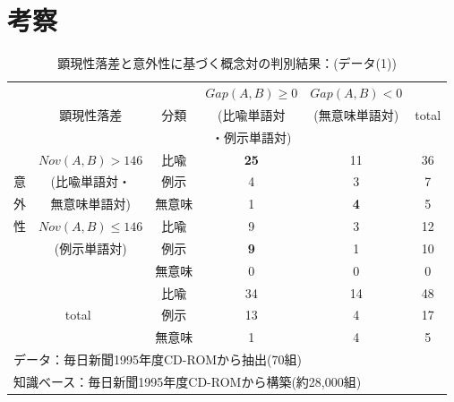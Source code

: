 \section{考察}
\begin{table}[tb]
  \begin{center}
     \caption{顕現性落差と意外性に基づく概念対の判別結果：(データ(1))}
     \label{tbl:eval1}
\begin{tabular}{|c|c|c|c|c||c|}
\hline
   &	&	&$Gap(A,B){\geq}0$ & $Gap(A,B)<0$&\\
   &{顕現性落差}&{分類}	&(比喩単語対	&(無意味単語対)	&total\\
   &		&	&・例示単語対)	&	&\\
\hline
   \cline{2-6}
   & $Nov(A,B)>146$   	& 比喩   &{\bf 25}&11	&36 \\
         \cline{3-6}
意 & (比喩単語対・	& 例示   &4	&3	&7 \\	
         \cline{3-6}
外 &  無意味単語対)  	& 無意味 &1	&{\bf 4}&5 \\
   \cline{2-6}
性 &$Nov(A,B){\leq}146$	& 比喩   &9	&3	&12\\
         \cline{3-6}
   & (例示単語対)	& 例示   &{\bf 9}&1	&10\\
         \cline{3-6}
   &		   	& 無意味 &0	&0	&0 \\
\hline
\hline
\multicolumn{2}{|c|}{}
   			& 比喩	&34	&14	&48\\
         \cline{3-6}
\multicolumn{2}{|c|}{total}
   			& 例示	&13	&4	&17\\
         \cline{3-6}
\multicolumn{2}{|c|}{}
   			& 無意味&1	&4	&5\\
\hline
\multicolumn{5}{l}{データ：毎日新聞1995年度CD-ROMから抽出(70組)}\\
\multicolumn{5}{l}{知識ベース：毎日新聞1995年度CD-ROMから構築(約28,000組)}\\
\end{tabular}
\end{center}
\end{table}
